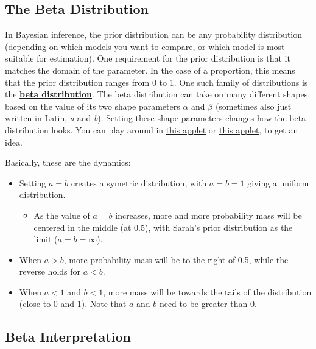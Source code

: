\documentclass[
  letterpaper,
  DIV=11,
  numbers=noendperiod]{scrreprt}
\providecommand{\tightlist}{%
  \setlength{\itemsep}{0pt}\setlength{\parskip}{0pt}}\usepackage{longtable,booktabs,array}
\begin{document}
\hypertarget{the-beta-distribution}{%
\subsection{The Beta Distribution}\label{the-beta-distribution}}

In Bayesian inference, the prior distribution can be any probability
distribution (depending on which models you want to compare, or which
model is most suitable for estimation). One requirement for the prior
distribution is that it matches the domain of the parameter. In the case
of a proportion, this means that the prior distribution ranges from 0 to
1. One such family of distributions is the
\href{https://en.wikipedia.org/wiki/Beta_distribution}{\textbf{beta
distribution}}. The beta distribution can take on many different shapes,
based on the value of its two shape parameters \(\alpha\) and \(\beta\)
(sometimes also just written in Latin, \emph{a} and \emph{b}). Setting
these shape parameters changes how the beta distribution looks. You can
play around in
\href{https://researchmethodsuva.shinyapps.io/BayesTestMini/}{this
applet} or
\href{https://homepage.divms.uiowa.edu/~mbognar/applets/beta.html}{this
applet}, to get an idea.

Basically, these are the dynamics:

\begin{itemize}
\tightlist
\item
  Setting \(a = b\) creates a symetric distribution, with \(a = b = 1\)
  giving a uniform distribution.

  \begin{itemize}
  \tightlist
  \item
    As the value of \(a = b\) increases, more and more probability mass
    will be centered in the middle (at 0.5), with Sarah's prior
    distribution as the limit (\(a = b = \infty\)).
  \end{itemize}
\item
  When \(a > b\), more probability mass will be to the right of 0.5,
  while the reverse holds for \(a < b\).
\item
  When \(a < 1\) and \(b < 1\), more mass will be towards the tails of
  the distribution (close to 0 and 1). Note that \(a\) and \(b\) need to
  be greater than 0.
\end{itemize}

\hypertarget{beta-interpretation-updating-section}{%
\subsection{Beta
Interpretation}\label{beta-interpretation-updating-section}}
\end{document}
